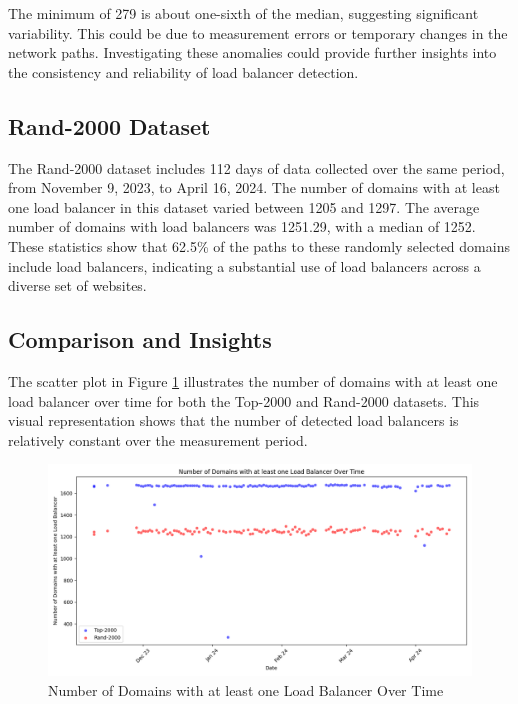 \documentclass[12pt]{cwru_thesis}
\begin{document}
The minimum of 279 is about one-sixth of the median, suggesting significant variability. This could be due to measurement errors or temporary changes in the network paths. Investigating these anomalies could provide further insights into the consistency and reliability of load balancer detection.

\subsection{Rand-2000 Dataset}

The Rand-2000 dataset includes 112 days of data collected over the same period, from November 9, 2023, to April 16, 2024. The number of domains with at least one load balancer in this dataset varied between 1205 and 1297. The average number of domains with load balancers was 1251.29, with a median of 1252. These statistics show that 62.5\% of the paths to these randomly selected domains include load balancers, indicating a substantial use of load balancers across a diverse set of websites.

\subsection{Comparison and Insights}

The scatter plot in Figure \ref{fig:scatter_plot_domains} illustrates the number of domains with at least one load balancer over time for both the Top-2000 and Rand-2000 datasets. This visual representation shows that the number of detected load balancers is relatively constant over the measurement period.

\begin{figure}[h]
    \centering
    \includegraphics[width=\textwidth]{figures/scatter_plot_domains.png}
    \caption{Number of Domains with at least one Load Balancer Over Time}
    \label{fig:scatter_plot_domains}
\end{figure}
\end{document}
